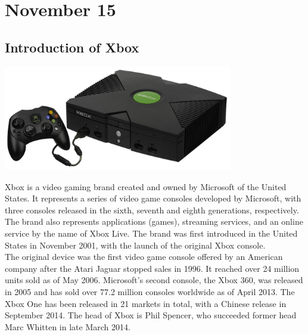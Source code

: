 \documentclass[11pt]{report}
\begin{document}
\section{November 15}
\subsection{Introduction of Xbox}
\vspace{2mm}\begin{center}\includegraphics[width=10cm]{./img/xbox1.jpg}\end{center}
Xbox is a video gaming brand created and owned by Microsoft of the United States. It represents a series of video game consoles developed by Microsoft, with three consoles released in the sixth, seventh and eighth generations, respectively. The brand also represents applications (games), streaming services, and an online service by the name of Xbox Live. The brand was first introduced in the United States in November 2001, with the launch of the original Xbox console.\\
The original device was the first video game console offered by an American company after the Atari Jaguar stopped sales in 1996. It reached over 24 million units sold as of May 2006. Microsoft's second console, the Xbox 360, was released in 2005 and has sold over 77.2 million consoles worldwide as of April 2013. The Xbox One has been released in 21 markets in total, with a Chinese release in September 2014. The head of Xbox is Phil Spencer, who succeeded former head Marc Whitten in late March 2014.
\section{}
\end{document}

